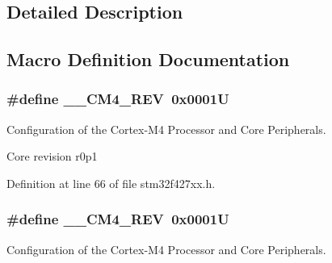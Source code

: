 \subsection{Detailed Description}


\subsection{Macro Definition Documentation}
\subsubsection[{\texorpdfstring{\+\_\+\+\_\+\+C\+M4\+\_\+\+R\+EV}{__CM4_REV}}]{\setlength{\rightskip}{0pt plus 5cm}\#define \+\_\+\+\_\+\+C\+M4\+\_\+\+R\+EV~0x0001U}\hypertarget{group___configuration__section__for___c_m_s_i_s_ga45a97e4bb8b6ce7c334acc5f45ace3ba}{}\label{group___configuration__section__for___c_m_s_i_s_ga45a97e4bb8b6ce7c334acc5f45ace3ba}


Configuration of the Cortex-\/\+M4 Processor and Core Peripherals. 

Core revision r0p1 

Definition at line 66 of file stm32f427xx.\+h.

\subsubsection[{\texorpdfstring{\+\_\+\+\_\+\+C\+M4\+\_\+\+R\+EV}{__CM4_REV}}]{\setlength{\rightskip}{0pt plus 5cm}\#define \+\_\+\+\_\+\+C\+M4\+\_\+\+R\+EV~0x0001U}\hypertarget{group___configuration__section__for___c_m_s_i_s_ga45a97e4bb8b6ce7c334acc5f45ace3ba}{}\label{group___configuration__section__for___c_m_s_i_s_ga45a97e4bb8b6ce7c334acc5f45ace3ba}


Configuration of the Cortex-\/\+M4 Processor and Core Peripherals. 

